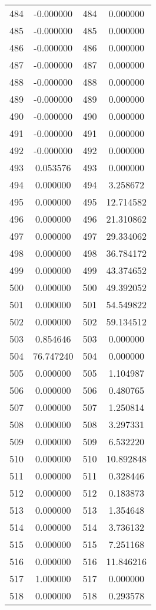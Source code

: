\documentclass[12pt]{article}
\begin{document}
\begin{longtable}{@{}cccc@{}}
484 & -0.000000 & 484 & 0.000000 \\
485 & -0.000000 & 485 & 0.000000 \\
486 & -0.000000 & 486 & 0.000000 \\
487 & -0.000000 & 487 & 0.000000 \\
488 & -0.000000 & 488 & 0.000000 \\
489 & -0.000000 & 489 & 0.000000 \\
490 & -0.000000 & 490 & 0.000000 \\
491 & -0.000000 & 491 & 0.000000 \\
492 & -0.000000 & 492 & 0.000000 \\
493 & 0.053576 & 493 & 0.000000 \\
494 & 0.000000 & 494 & 3.258672 \\
495 & 0.000000 & 495 & 12.714582 \\
496 & 0.000000 & 496 & 21.310862 \\
497 & 0.000000 & 497 & 29.334062 \\
498 & 0.000000 & 498 & 36.784172 \\
499 & 0.000000 & 499 & 43.374652 \\
500 & 0.000000 & 500 & 49.392052 \\
501 & 0.000000 & 501 & 54.549822 \\
502 & 0.000000 & 502 & 59.134512 \\
503 & 0.854646 & 503 & 0.000000 \\
504 & 76.747240 & 504 & 0.000000 \\
505 & 0.000000 & 505 & 1.104987 \\
506 & 0.000000 & 506 & 0.480765 \\
507 & 0.000000 & 507 & 1.250814 \\
508 & 0.000000 & 508 & 3.297331 \\
509 & 0.000000 & 509 & 6.532220 \\
510 & 0.000000 & 510 & 10.892848 \\
511 & 0.000000 & 511 & 0.328446 \\
512 & 0.000000 & 512 & 0.183873 \\
513 & 0.000000 & 513 & 1.354648 \\
514 & 0.000000 & 514 & 3.736132 \\
515 & 0.000000 & 515 & 7.251168 \\
516 & 0.000000 & 516 & 11.846216 \\
517 & 1.000000 & 517 & 0.000000 \\
518 & 0.000000 & 518 & 0.293578 \\

\end{longtable}
\end{document}
